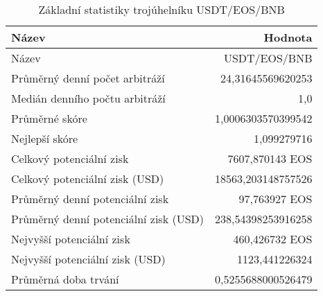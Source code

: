 \begin{table}\centering
\caption{Základní statistiky trojúhelníku USDT/EOS/BNB}
\label{USDTEOSBNB_stats}
\begin{tabular}{|| l | r ||}
\hline Název & Hodnota \\ 
\hline\hline Název & USDT/EOS/BNB \\ 
\hline Průměrný denní počet arbitráží & 24,31645569620253 \\ 
\hline Medián denního počtu arbitráží & 1,0 \\ 
\hline Průměrné skóre & 1,0006303570399542 \\ 
\hline Nejlepší skóre & 1,099279716 \\ 
\hline Celkový potenciální zisk & 7607,870143 EOS \\ 
\hline Celkový potenciální zisk (USD) & 18563,203148757526 \\ 
\hline Průměrný denní potenciální zisk & 97,763927 EOS \\ 
\hline Průměrný denní potenciální zisk (USD) & 238,54398253916258 \\ 
\hline Nejvyšší potenciální zisk & 460,426732 EOS \\ 
\hline Nejvyšší potenciální zisk (USD) & 1123,441226324 \\ 
\hline Průměrná doba trvání & 0,5255688000526479 \\ 
\hline
\end{tabular}
\end{table}